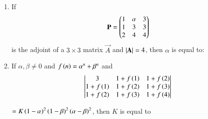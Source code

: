 \documentclass[journal,onecolumn]{IEEEtran}
\theoremstyle{remark}
\begin{document}
\begin{enumerate}
	\item If \begin{align*}
		\mathbf{P} = \begin{pmatrix}1&\alpha&3\\
		1&3&3\\
		2&4&4\end{pmatrix}
	\end{align*} is the adjoint of a $3\times3$ matrix $\vec{A}$ and $\left\vert\mathbf{A}\right\vert = 4$, then $\alpha$ is equal to:
	\hfill{}
        \begin{enumerate}
        \end{enumerate}

	\item If $\alpha,\beta\neq 0$ and $f\left(n\right) = \alpha^n + \beta^n$ and
		\newline
		\begin{align*}
			\begin{vmatrix}
				3 & 1+f\left(1\right) & 1+f\left(2\right)\\
				1+f\left(1\right) & 1+f\left(2\right) & 1+f\left(3\right)\\
				1+f\left(2\right) & 1+f\left(3\right) & 1+f\left(4\right)
			\end{vmatrix}
		\end{align*}

		$=K\left(1-\alpha\right)^2\left(1-\beta\right)^2\left(\alpha-\beta\right)^2$,
		then $K$ is equal to

	\hfill{}
        \begin{enumerate}
        \end{enumerate}



\end{enumerate}
\end{document}
